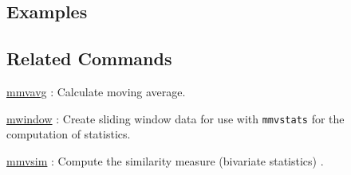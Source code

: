 \subsection*{Examples}

\subsection*{Related Commands}
\hyperref[sect:mmvavg] {mmvavg} : Calculate moving average.

\hyperref[sect:mwindow] {mwindow} : Create sliding window data for use with \verb|mmvstats| for the computation of statistics. 

\hyperref[sect:mmvsim] {mmvsim} : Compute the similarity measure (bivariate statistics) .
%

